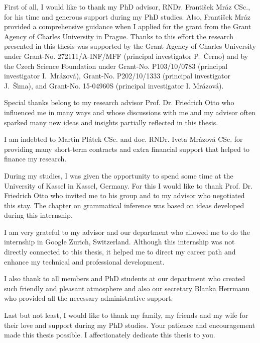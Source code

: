 \documentclass[12pt,a4paper,twoside,openright,natbib]{book}
\begin{document}
\newpage


\openright

\noindent
First of all, I would like to thank my PhD advisor, RNDr. František Mráz CSc., for his time and generous support during my PhD studies. Also, František Mráz provided a comprehensive guidance when I applied for the grant from the Grant Agency of Charles University in Prague. Thanks to this effort the research presented in this thesis was supported by the Grant Agency of Charles University under Grant-No. 272111/A-INF/MFF (principal investigator P.~{\v C}erno) and by the Czech Science Foundation under Grant-No. P103/10/0783 (principal investigator I.~Mr{\'a}zov{\'a}), Grant-No. P202/10/1333 (principal investigator J.~{\v S}{\'\i}ma), and Grant-No. 15-04960S (principal investigator I. Mr{\'a}zov{\'a}).

Special thanks belong to my research advisor Prof. Dr. Friedrich Otto who influenced me in many ways and whose discussions with me and my advisor often sparked many new ideas and insights partially reflected in this thesis.

I am indebted to Martin Plátek CSc. and doc. RNDr. Iveta Mrázová CSc.  for providing many short-term contracts and extra financial support that helped to finance my research.

During my studies, I was given the opportunity to spend some time at the University of Kassel in Kassel, Germany. For this I would like to thank Prof. Dr. Friedrich Otto who invited me to his group and to my advisor who negotiated this stay. The chapter on grammatical inference was based on ideas developed during this internship.

I am very grateful to my advisor and our department who allowed me to do the internship in Google Zurich, Switzerland. Although this internship was not directly connected to this thesis, it helped me to direct my career path and enhance my technical and professional development.

I also thank to all members and PhD students at our department who created such friendly and pleasant atmosphere and also our secretary Blanka Herrmann who provided all the necessary administrative support.

Last but not least, I would like to thank my family, my friends and my wife for their love and support during my PhD studies. Your patience and encouragement made this thesis possible. I affectionately dedicate this thesis to you.
\end{document}
